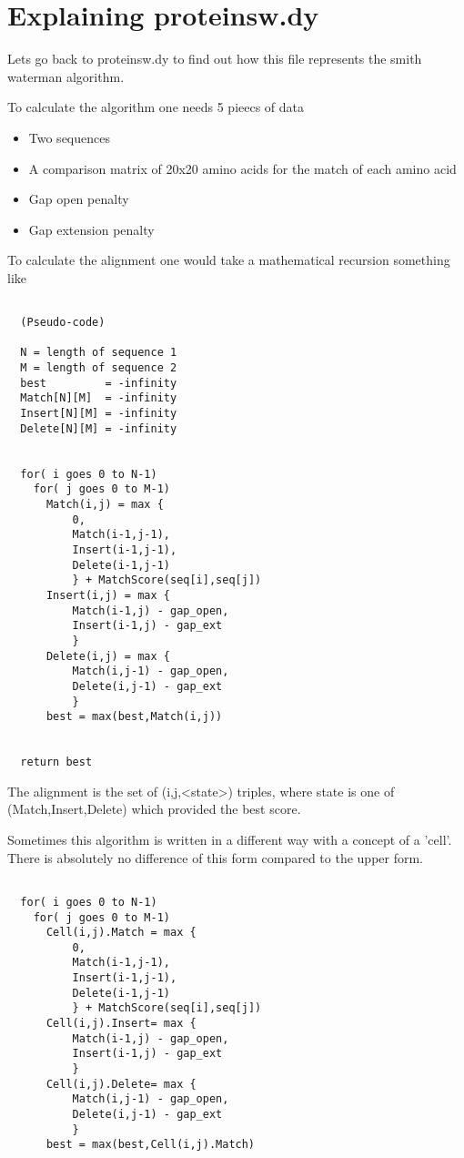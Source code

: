 \section{Explaining proteinsw.dy}
Lets go back to proteinsw.dy to find out how this file represents the
smith waterman algorithm.

To calculate the algorithm one needs 5 pieecs of data
\begin{itemize}
\item Two sequences
\item A comparison matrix of 20x20 amino acids for the match of each amino acid 
\item Gap open penalty
\item Gap extension penalty
\end{itemize}

To calculate the alignment one would take a mathematical recursion 
something like

\begin{verbatim}

  (Pseudo-code)

  N = length of sequence 1
  M = length of sequence 2
  best         = -infinity
  Match[N][M]  = -infinity
  Insert[N][M] = -infinity
  Delete[N][M] = -infinity  


  for( i goes 0 to N-1)
    for( j goes 0 to M-1)  
      Match(i,j) = max {
          0,
          Match(i-1,j-1),
          Insert(i-1,j-1),
          Delete(i-1,j-1)
          } + MatchScore(seq[i],seq[j])
      Insert(i,j) = max {
          Match(i-1,j) - gap_open,
          Insert(i-1,j) - gap_ext
          }
      Delete(i,j) = max {
          Match(i,j-1) - gap_open,
          Delete(i,j-1) - gap_ext
          }
      best = max(best,Match(i,j))
      

  return best
\end{verbatim}


The alignment is the set of (i,j,<state>) triples, where state is one of (Match,Insert,Delete)
which provided the best score.

Sometimes this algorithm is written in a different way with a concept of a 'cell'.
There is absolutely no difference of this form compared to the upper form.

\begin{verbatim}

  for( i goes 0 to N-1)
    for( j goes 0 to M-1)  
      Cell(i,j).Match = max {
          0,
          Match(i-1,j-1),
          Insert(i-1,j-1),
          Delete(i-1,j-1)
          } + MatchScore(seq[i],seq[j])
      Cell(i,j).Insert= max {
          Match(i-1,j) - gap_open,
          Insert(i-1,j) - gap_ext
          }
      Cell(i,j).Delete= max {
          Match(i,j-1) - gap_open,
          Delete(i,j-1) - gap_ext
          }
      best = max(best,Cell(i,j).Match)

\end{verbatim}


